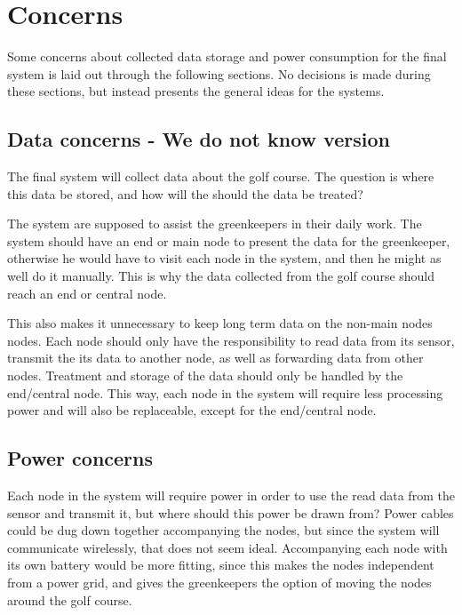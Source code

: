 \section{Concerns}
Some concerns about collected data storage and power consumption for the final system is laid out through the following sections. No decisions is made during these sections, but instead presents the general ideas for the systems.

\subsection{Data concerns - We do not know version}
The final system will collect data about the golf course. The question is where this data be stored, and how will the should the data be treated?

The system are supposed to assist the greenkeepers in their daily work. The system should have an end or main node to present the data for the greenkeeper, otherwise he would have to visit each node in the system, and then he might as well do it manually. This is why the data collected from the golf course should reach an end or central node.

This also makes it unnecessary to keep long term data on the non-main nodes nodes. Each node should only have the responsibility to read data from its sensor, transmit the its data to another node, as well as forwarding data from other nodes. Treatment and storage of the data should only be handled by the end/central node. This way, each node in the system will require less processing power and will also be replaceable, except for the end/central node.



\subsection{Power concerns}

Each node in the system will require power in order to use the read data from the sensor and transmit it, but where should this power be drawn from? Power cables could be dug down together accompanying the nodes, but since the system will communicate wirelessly, that does not seem ideal. Accompanying each node with its own battery would be more fitting, since this makes the nodes independent from a power grid, and gives the greenkeepers the option of moving the nodes around the golf course.




